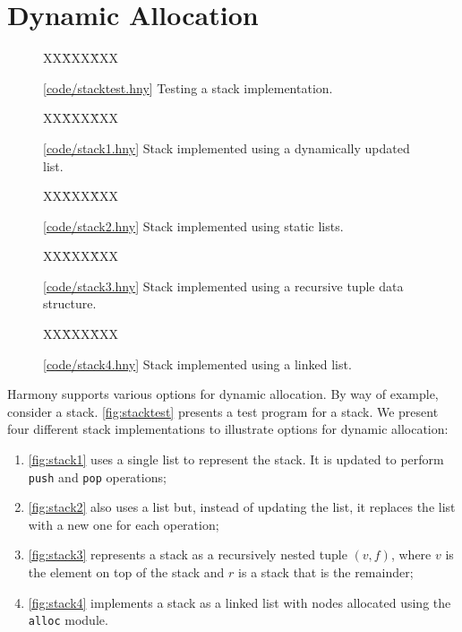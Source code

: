 \documentclass{report}
\newcommand{\harmonysource}[1]{
\begin{tabbing}
XX\=XXX\=XXX\kill
    
\end{tabbing}
}
\newcommand{\harmonylink}[1]{%
[\href{https://harmony.cs.cornell.edu/#1}{\underline{#1}}]%
}
\newenvironment{code}{
\tcolorbox
}{
\endtcolorbox
}
\begin{document}
\section{Dynamic Allocation}

\begin{figure}
\begin{code}
\harmonysource{stacktest}
\end{code}
\caption{\harmonylink{code/stacktest.hny} Testing a stack implementation.}
\label{fig:stacktest}
\end{figure}

\begin{figure}
\begin{code}
\harmonysource{stack1}
\end{code}
\caption{\harmonylink{code/stack1.hny} Stack implemented using a dynamically updated list.}
\label{fig:stack1}
\end{figure}

\begin{figure}
\begin{code}
\harmonysource{stack2}
\end{code}
\caption{\harmonylink{code/stack2.hny} Stack implemented using static lists.}
\label{fig:stack2}
\end{figure}

\begin{figure}
\begin{code}
\harmonysource{stack3}
\end{code}
\caption{\harmonylink{code/stack3.hny} Stack implemented using a recursive tuple data structure.}
\label{fig:stack3}
\end{figure}

\begin{figure}
\begin{code}
\harmonysource{stack4}
\end{code}
\caption{\harmonylink{code/stack4.hny} Stack implemented using a linked list.}
\label{fig:stack4}
\end{figure}

Harmony supports various options for dynamic allocation.
By way of example, consider a stack.
\autoref{fig:stacktest} presents a test program for a stack.
We present four different stack implementations to illustrate
options for dynamic allocation:
\begin{enumerate}
\item[] \autoref{fig:stack1} uses a single list to represent the
stack.  It is updated to perform \texttt{push} and \texttt{pop} operations;
\item[] \autoref{fig:stack2} also uses a list but, instead of updating
the list, it replaces the list with a new one for each operation;
\item[] \autoref{fig:stack3} represents a stack as a recursively nested tuple
$(v, f)$, where $v$ is the element on top of the stack and $r$ is a stack
that is the remainder;
\item[] \autoref{fig:stack4} implements a stack as a linked list with nodes
allocated using the \texttt{alloc} module.
\end{enumerate}
\end{document}
